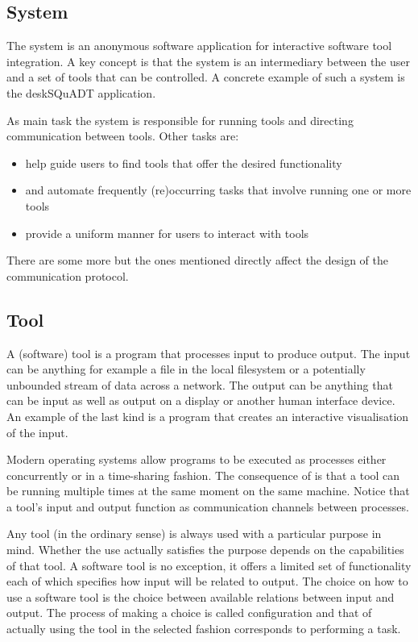 \documentclass{article}
\begin{document}
  \subsection{System}

   The system is an anonymous software application for interactive software tool
   integration. A key concept is that the system is an intermediary between the
   user and a set of tools that can be controlled. A concrete example of such a
   system is the deskSQuADT application.

   As main task the system is responsible for running tools and directing
   communication between tools. Other tasks are:
   
    \begin{itemize}
     \item help guide users to find tools that offer the desired functionality
     \item and automate frequently (re)occurring tasks that involve running one or more tools
     \item provide a uniform manner for users to interact with tools
    \end{itemize}

   There are some more but the ones mentioned directly affect the design of the
   communication protocol.

  \subsection{Tool}

   A (software) tool is a program that processes input to produce output. The
   input can be anything for example a file in the local filesystem or a
   potentially unbounded stream of data across a network. The output can be
   anything that can be input as well as output on a display or another human
   interface device. An example of the last kind is a program that creates an
   interactive visualisation of the input.
   
   Modern operating systems allow programs to be executed as processes either
   concurrently or in a time-sharing fashion. The consequence of is that a tool
   can be running multiple times at the same moment on the same machine. Notice
   that a tool's input and output function as communication channels between
   processes. %

   Any tool (in the ordinary sense) is always used with a particular purpose in
   mind. Whether the use actually satisfies the purpose depends on the
   capabilities of that tool. A software tool is no exception, it offers a
   limited set of functionality each of which specifies how input will be
   related to output.  The choice on how to use a software tool is the choice
   between available relations between input and output.  The process of making
   a choice is called configuration and that of actually using the tool in the
   selected fashion corresponds to performing a task.
\end{document}
